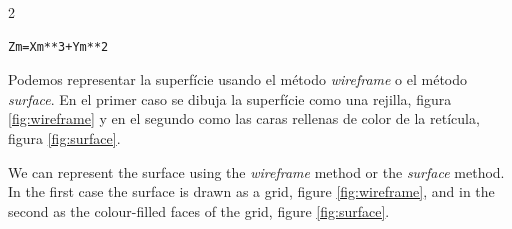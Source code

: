\begin{paracol} {2}
\begin{verbatim}
Zm=Xm**3+Ym**2
\end{verbatim}

\switchcolumn
Podemos representar la superfície usando el método \textit{wireframe} o el método \textit{surface}. En el primer caso se dibuja la superfície como una rejilla, figura \ref{fig:wireframe} y en el segundo como las caras rellenas de color de la retícula, figura \ref{fig:surface}.

\switchcolumn

We can represent the surface using the \textit{wireframe} method or the \textit{surface} method. In the first case the surface is drawn as a grid, figure \ref{fig:wireframe}, and in the second as the colour-filled faces of the grid, figure \ref{fig:surface}.

\end{paracol}

\begin{figure}[h]
\centering
{} %
{}\\
\end{figure}

